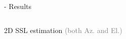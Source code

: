 \begin{frame}{\mirage - Results}
\begin{columns}[T,onlytextwidth]
\begin{column}{.58\textwidth}
        \end{column}
    \end{columns}

    \pause[4]
    \vspace{5mm}
    \begin{columns}[T,onlytextwidth]
        \begin{column}{.25\textwidth}
            \begin{block}{2D SSL estimation}
                \textcolor{gray}{\small (both Az. and El.)}
            \end{block}
        \end{column}


\end{columns}
\end{frame}

